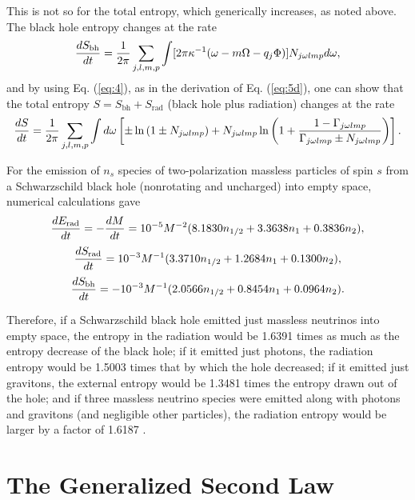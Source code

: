 \documentclass[12pt]{article} \usepackage{latexsym} \textwidth 15cm
\begin{document}
This is not so for the total entropy, which generically increases, as
noted above.  The black hole entropy changes at the rate
 \begin{equation}
 {dS_{\mathrm{bh}}\over dt}
 = {1\over 2\pi}\sum_{j,l,m,p}\int
 [2\pi\kappa^{-1}(\omega-m\Omega-q_j\Phi)] N_{j\omega lmp} d\omega,
 \label{eq:13}
 \end{equation}
and by using Eq. (\ref{eq:4}), as in the derivation of
Eq. (\ref{eq:5d}), one can show that the total entropy
$S=S_{\mathrm{bh}}+S_{\mathrm{rad}}$ (black hole plus radiation) changes
at the rate
 \begin{equation}
 {dS\over dt}
 = {1\over 2\pi}\sum_{j,l,m,p}\int d\omega
 \left[ \pm \ln{(1\pm N_{j\omega lmp})}
   +N_{j\omega lmp}\ln{\left(1+{1-\Gamma_{j\omega lmp} \over \Gamma_{j\omega lmp}
     \pm N_{j\omega lmp}} \right)} \right].
 \label{eq:14}
 \end{equation}

For the emission of $n_s$ species of two-polarization massless
particles of spin $s$ from a Schwarzschild black hole
(nonrotating and uncharged) into empty space, numerical calculations
\cite{Page76,Page76b,Page83} gave
 \begin{equation}
 {dE_{\mathrm{rad}}\over dt} = -{dM\over dt}
 = 10^{-5} M^{-2}(8.1830 n_{1/2} + 3.3638 n_1 + 0.3836 n_2),
 \label{eq:15}
 \end{equation}
 \begin{equation}
 {dS_{\mathrm{rad}}\over dt}
 = 10^{-3} M^{-1}(3.3710 n_{1/2} + 1.2684 n_1 + 0.1300 n_2),
 \label{eq:16}
 \end{equation}
 \begin{equation}
 {dS_{\mathrm{bh}}\over dt}
 = - 10^{-3} M^{-1}(2.0566 n_{1/2} + 0.8454 n_1 + 0.0964 n_2).
 \label{eq:17}
 \end{equation}

Therefore, if a Schwarzschild black hole emitted just massless
neutrinos into empty space, the entropy in the radiation would be
1.6391 times as much as the entropy decrease of the black hole; if it
emitted just photons, the radiation entropy would be 1.5003 times that
by which the hole decreased; if it emitted just gravitons, the
external entropy would be 1.3481 times the entropy drawn out of the
hole; and if three massless neutrino species were emitted along with
photons and gravitons (and negligible other particles), the radiation
entropy would be larger by a factor of 1.6187 \cite{Page83}.

\section{The Generalized Second Law}
\end{document}
